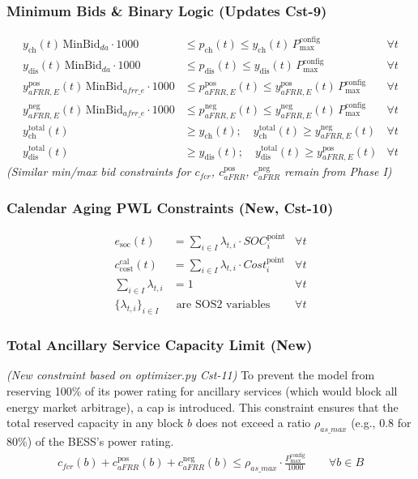 \documentclass[11pt, a4paper]{article}
\begin{document}
\subsubsection{Minimum Bids \& Binary Logic (Updates Cst-9)}
\begin{align}
    y_{\mathrm{ch}}(t)\,\text{MinBid}_{da} \cdot 1000 &\le p_{\mathrm{ch}}(t) \le y_{\mathrm{ch}}(t)\,P^{\mathrm{config}}_{\max} & \forall t \\
    y_{\mathrm{dis}}(t)\,\text{MinBid}_{da} \cdot 1000 &\le p_{\mathrm{dis}}(t) \le y_{\mathrm{dis}}(t)\,P^{\mathrm{config}}_{\max} & \forall t \\
    y^{\mathrm{pos}}_{aFRR,E}(t)\,\text{MinBid}_{afrr\_e} \cdot 1000 &\le p^{\mathrm{pos}}_{aFRR,E}(t) \le y^{\mathrm{pos}}_{aFRR,E}(t)\,P^{\mathrm{config}}_{\max} & \forall t \\
    y^{\mathrm{neg}}_{aFRR,E}(t)\,\text{MinBid}_{afrr\_e} \cdot 1000 &\le p^{\mathrm{neg}}_{aFRR,E}(t) \le y^{\mathrm{neg}}_{aFRR,E}(t)\,P^{\mathrm{config}}_{\max} & \forall t \\
    y^{\mathrm{total}}_{\mathrm{ch}}(t) &\ge y_{\mathrm{ch}}(t); \quad y^{\mathrm{total}}_{\mathrm{ch}}(t) \ge y^{\mathrm{neg}}_{aFRR,E}(t) & \forall t \\
    y^{\mathrm{total}}_{\mathrm{dis}}(t) &\ge y_{\mathrm{dis}}(t); \quad y^{\mathrm{total}}_{\mathrm{dis}}(t) \ge y^{\mathrm{pos}}_{aFRR,E}(t) & \forall t
\end{align}
\textit{(Similar min/max bid constraints for $c_{fcr}$, $c^{\mathrm{pos}}_{aFRR}$, $c^{\mathrm{neg}}_{aFRR}$ remain from Phase I)}

\subsubsection{Calendar Aging PWL Constraints (New, Cst-10)}
\begin{align}
    e_{\mathrm{soc}}(t) &= \sum_{i \in I} \lambda_{t,i} \cdot SOC^{\mathrm{point}}_i & \forall t \\
    c^{\mathrm{cal}}_{\mathrm{cost}}(t) &= \sum_{i \in I} \lambda_{t,i} \cdot Cost^{\mathrm{point}}_i & \forall t \\
    \sum_{i \in I} \lambda_{t,i} &= 1 & \forall t \\
    \{\lambda_{t,i}\}_{i \in I} &\text{ are SOS2 variables} & \forall t
\end{align}

\subsubsection{Total Ancillary Service Capacity Limit (New)}
\textit{(New constraint based on optimizer.py Cst-11)}
To prevent the model from reserving 100\% of its power rating for ancillary services (which would block all energy market arbitrage), a cap is introduced. This constraint ensures that the total reserved capacity in any block $b$ does not exceed a ratio $\rho_{as\_max}$ (e.g., 0.8 for 80\%) of the BESS's power rating.
\begin{align}
    c_{fcr}(b) + c^{\mathrm{pos}}_{aFRR}(b) + c^{\mathrm{neg}}_{aFRR}(b) \le \rho_{as\_max} \cdot \frac{P^{\mathrm{config}}_{\max}}{1000} \qquad \forall b \in B
\end{align}
\end{document}
